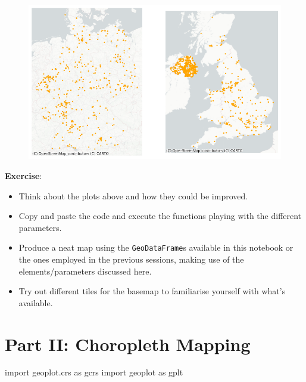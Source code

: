 \documentclass[
  letterpaper,
  DIV=11,
  numbers=noendperiod]{scrreprt}
\newenvironment{Shaded}{\begin{snugshade}}{\end{snugshade}}
\newcommand{\ImportTok}[1]{\textcolor[rgb]{0.00,0.46,0.62}{#1}}
\newcommand{\NormalTok}[1]{\textcolor[rgb]{0.00,0.23,0.31}{#1}}
\providecommand{\tightlist}{%
  \setlength{\itemsep}{0pt}\setlength{\parskip}{0pt}}\usepackage{longtable,booktabs,array}
\begin{document}
\begin{figure}[H]

{\centering \includegraphics{labs/w02_maps_files/figure-pdf/cell-23-output-1.png}

}

\end{figure}

\textbf{Exercise}:

\begin{itemize}
\tightlist
\item
  Think about the plots above and how they could be improved.
\item
  Copy and paste the code and execute the functions playing with the
  different parameters.
\item
  Produce a neat map using the \texttt{GeoDataFrame}s available in this
  notebook or the ones employed in the previous sessions, making use of
  the elements/parameters discussed here.
\item
  Try out different tiles for the basemap to familiarise yourself with
  what's available.
\end{itemize}

\hypertarget{part-ii-choropleth-mapping}{%
\section{Part II: Choropleth Mapping}\label{part-ii-choropleth-mapping}}

\begin{Shaded}
\begin{Highlighting}[]
\ImportTok{import}\NormalTok{ geoplot.crs }\ImportTok{as}\NormalTok{ gcrs}
\ImportTok{import}\NormalTok{ geoplot }\ImportTok{as}\NormalTok{ gplt}
\end{Highlighting}
\end{Shaded}
\end{document}

